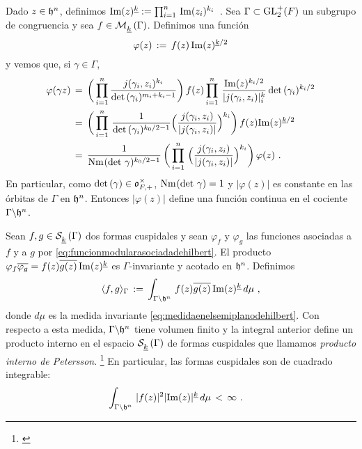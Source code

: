 Dado $z\in\mathfrak{h}^{n}$, definimos
\begin{math}
	\mathrm{Im}(z)^{\underline{k}}:=
		\prod_{i=1}^{n}\,\mathrm{Im}(z_{i})^{k_{i}}
\end{math}~.
Sea $\Gamma\subset\mathrm{GL}^{+}_{2}(F)$ un subgrupo de congruencia y sea
$f\in\mathcal{M}^{}_{\underline{k}}\left(\Gamma\right)$. Definimos una funci\'{o}n
\begin{equation}
	\label{eq:funcionmodularasociadadehilbert}
	\varphi(z) \,:=\,f(z)\,\mathrm{Im}(z)^{\underline{k}/2}
\end{equation}
%
y vemos que, si $\gamma\in\Gamma$,
\begin{align*}
	\varphi(\gamma z) & \,=\,
		\bigg(\prod_{i=1}^{n}\frac{j(\gamma_{i},z_{i})^{k_{i}}}%
		{\det(\gamma_{i})^{m_{i}+k_{i}-1}}\bigg)\, f(z)
	\prod_{i=1}^{n}\,\frac{\Im(z)^{k_{i}/2}}{|j(\gamma_{i},z_{i})|^k_{i}}\,
		\det(\gamma_{i})^{k_{i}/2} \\
	& \,=\, \bigg(\prod_{i=1}^{n}\,\frac{1}{\det(\gamma_{i})^{k_{0}/2-1}}
	\Big(\frac{j(\gamma_{i},z_{i})}{|j(\gamma_{i},z_{i})|}\Big)^{k_{i}}
		\bigg)\,f(z)\Im(z)^{\peso{k}/2} \\
	& \,=\, \frac{1}{\norma(\det\,\gamma)^{k_{0}/2-1}}\,
	\bigg(\prod_{i=1}^{n}\,\Big(\frac{j(\gamma_{i},z_{i})}{%
			|j(\gamma_{i},z_{i})|}\Big)^{k_{i}}\bigg)\,\varphi(z)
	\text{ .}
\end{align*}
%
En particular, como $\mathrm{det}\,(\gamma)\in\mathfrak{o}_{F,+}^{\times}$,
$\mathrm{Nm}_{}(\mathrm{det}\,\,\gamma)=1$ y $|\varphi(z)|$ es constante en las \'{o}rbitas
de $\Gamma$ en $\mathfrak{h}^{n}$. Entonces $|\varphi(z)|$ define una funci\'{o}n
continua en el cociente $\Gamma\backslash\mathfrak{h}^{n}$.

Sean $f,g\in\mathcal{S}^{}_{\underline{k}}\left(\Gamma\right)$ dos formas cuspidales y sean $\varphi_{f}$ y
$\varphi_{g}$ las funciones asociadas a $f$ y a $g$ por
\eqref{eq:funcionmodularasociadadehilbert}. El producto
\begin{math}
	\varphi_{f}\overline{\varphi_{g}}=
		f(z)\overline{g(z)}\,\mathrm{Im}(z)^{\underline{k}}
\end{math}
es $\Gamma$-invariante y acotado en $\mathfrak{h}^{n}$.
Definimos
\begin{equation}
	\label{eq:productodepeterssongamacero}
	\langle f,g\rangle_{\Gamma}\,:=\,
		\int_{\Gamma\backslash\mathfrak{h}^{n}}\,f(z)\overline{g(z)}\,
		\mathrm{Im}(z)^{\underline{k}}\,d\mu
	\text{ ,}
\end{equation}
%
donde $d\mu$ es la medida invariante \eqref{eq:medidaenelsemiplanodehilbert}.
Con respecto a esta medida, $\Gamma\backslash\mathfrak{h}^{n}$ tiene volumen
finito y la integral anterior define un producto interno en el espacio
$\mathcal{S}^{}_{\underline{k}}\left(\Gamma\right)$ de formas cuspidales que llamamos \emph{producto interno %
de Petersson}.%
\footnote{
	\cite[Ch.~II]{FreitagForms}
}
En particular, las formas cuspidales son de cuadrado integrable:
\begin{align*}
	\int_{\Gamma\backslash\mathfrak{h}^{n}}\,|f(z)|^{2}|\mathrm{Im}(z)|^{\underline{k}}
		\,d\mu & \,<\, \infty
	\text{ .}
\end{align*}
%

